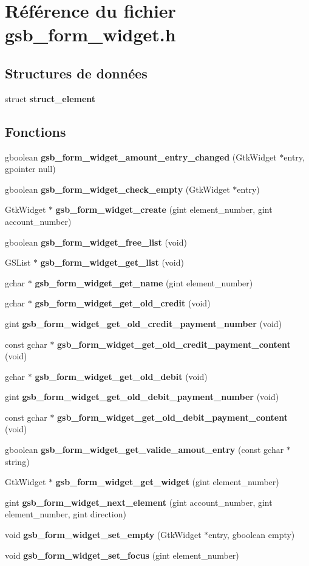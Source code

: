 \section{Référence du fichier gsb\_\-form\_\-widget.h}
\label{gsb__form__widget_8h}
\subsection*{Structures de données}
\begin{DoxyCompactItemize}
\item 
struct {\bf struct\_\-element}
\end{DoxyCompactItemize}
\subsection*{Fonctions}
\begin{DoxyCompactItemize}
\item 
gboolean {\bf gsb\_\-form\_\-widget\_\-amount\_\-entry\_\-changed} (GtkWidget $\ast$entry, gpointer null)
\item 
gboolean {\bf gsb\_\-form\_\-widget\_\-check\_\-empty} (GtkWidget $\ast$entry)
\item 
GtkWidget $\ast$ {\bf gsb\_\-form\_\-widget\_\-create} (gint element\_\-number, gint account\_\-number)
\item 
gboolean {\bf gsb\_\-form\_\-widget\_\-free\_\-list} (void)
\item 
GSList $\ast$ {\bf gsb\_\-form\_\-widget\_\-get\_\-list} (void)
\item 
gchar $\ast$ {\bf gsb\_\-form\_\-widget\_\-get\_\-name} (gint element\_\-number)
\item 
gchar $\ast$ {\bf gsb\_\-form\_\-widget\_\-get\_\-old\_\-credit} (void)
\item 
gint {\bf gsb\_\-form\_\-widget\_\-get\_\-old\_\-credit\_\-payment\_\-number} (void)
\item 
const gchar $\ast$ {\bf gsb\_\-form\_\-widget\_\-get\_\-old\_\-credit\_\-payment\_\-content} (void)
\item 
gchar $\ast$ {\bf gsb\_\-form\_\-widget\_\-get\_\-old\_\-debit} (void)
\item 
gint {\bf gsb\_\-form\_\-widget\_\-get\_\-old\_\-debit\_\-payment\_\-number} (void)
\item 
const gchar $\ast$ {\bf gsb\_\-form\_\-widget\_\-get\_\-old\_\-debit\_\-payment\_\-content} (void)
\item 
gboolean {\bf gsb\_\-form\_\-widget\_\-get\_\-valide\_\-amout\_\-entry} (const gchar $\ast$string)
\item 
GtkWidget $\ast$ {\bf gsb\_\-form\_\-widget\_\-get\_\-widget} (gint element\_\-number)
\item 
gint {\bf gsb\_\-form\_\-widget\_\-next\_\-element} (gint account\_\-number, gint element\_\-number, gint direction)
\item 
void {\bf gsb\_\-form\_\-widget\_\-set\_\-empty} (GtkWidget $\ast$entry, gboolean empty)
\item 
void {\bf gsb\_\-form\_\-widget\_\-set\_\-focus} (gint element\_\-number)
\end{DoxyCompactItemize}


